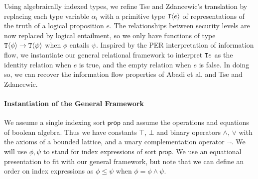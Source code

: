 Using algebraically indexed types, we refine Tse and Zdancewic's
translation by replacing each type variable $\alpha_l$ with a
primitive type $\textup{\texttt{T}}\langle e \rangle$ of representations of the truth of a
logical proposition $e$. The relationships between security levels are
now replaced by logical entailment, so we only have functions of type
$\textup{\texttt{T}}\langle \phi \rangle \to \textup{\texttt{T}}\langle \psi \rangle$ when $\phi$ entails
$\psi$. Inspired by the PER interpretation of information flow, we
instantiate our general relational framework to interpret
$\textup{\texttt{T}}{e}$ as the identity relation when $e$ is true, and the
empty relation when $e$ is false. In doing so, we can recover the
information flow properties of Abadi et al. and Tse and Zdancewic.

\paragraph{Instantiation of the General Framework}
We assume a single indexing sort $\mathsf{prop}$ and assume the
operations and equations of boolean algebra. Thus we have constants
$\top$, $\bot$ and binary operators $\land$, $\lor$ with the axioms of
a bounded lattice, and a unary complementation operator $\lnot$. We
will use $\phi, \psi$ to stand for index expressions of sort
$\mathsf{prop}$. We use an equational presentation to fit with our
general framework, but note that we can define an order on index
expressions as $\phi \leq \psi$ when $\phi = \phi \land \psi$.

